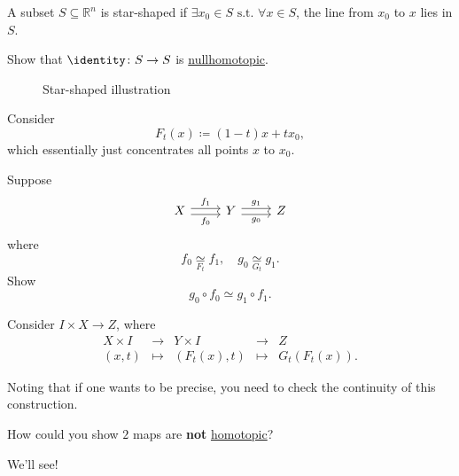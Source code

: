 \begin{exercise}
	A subset \(S\subseteq \mathbb{R} ^n\) is star-shaped if \(\exists x_0\in S \text{ s.t. }\forall x\in S\),
	the line from \(x_0\) to \(x\) lies in \(S\).

	Show that \(\identity\colon S\to S\) is \hyperref[def:nullhomotopic]{nullhomotopic}.

	\begin{figure}[H]
		\centering
		\caption{Star-shaped illustration}
		\label{fig:eg:star-shaped}
	\end{figure}
\end{exercise}
\begin{answer}
	Consider
	\[
		F_{t}(x) \coloneqq (1 - t)x+tx_0,
	\]
	which essentially just concentrates all points \(x\) to \(x_0\).
\end{answer}
\begin{exercise}
	Suppose
	\[
		\begin{tikzcd}
			X & Y & Z
			\arrow["{f_0}"', shift right=1, from=1-1, to=1-2]
			\arrow["{g_0}"', shift right=1, from=1-2, to=1-3]
			\arrow["{f_1}", shift left=1, from=1-1, to=1-2]
			\arrow["{g_1}", shift left=1, from=1-2, to=1-3]
		\end{tikzcd}
	\]
	where
	\[
		f_0 \underset{F_{t}}{\simeq} f_1,\quad g_0\underset{G_{t}}{\simeq} g_1.
	\]
	Show
	\[
		g_0\circ f_0\simeq g_{1}\circ f_1.
	\]
\end{exercise}
\begin{answer}
	Consider \(I\times X\to Z\), where
	\[
		\begin{array}{ccccc}
			X \times I & \to     & Y \times I  & \to     & Z                \\
			(x, t)     & \mapsto & (F_t(x), t) & \mapsto & G_{t}(F_{t}(x)).
		\end{array}
	\]
	\begin{remark}
		Noting that if one wants to be precise, you need to check the continuity of this construction.
	\end{remark}
\end{answer}

\begin{exercise}
	How could you show \(2\) maps are \textbf{not} \hyperref[def:homotopic]{homotopic}?
\end{exercise}
\begin{answer}
	We'll see!
\end{answer}